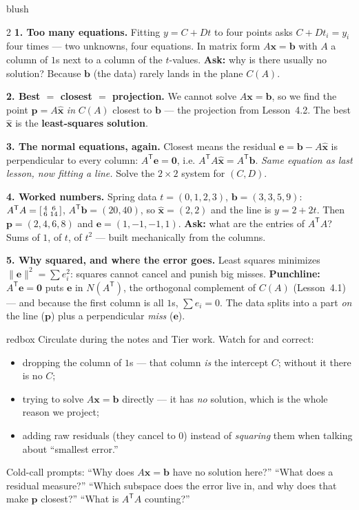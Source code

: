 \documentclass[10pt]{article}
\newcommand{\xx}{\mathbf{x}}
\newcommand{\bb}{\mathbf{b}}
\newcommand{\pp}{\mathbf{p}}
\newcommand{\ee}{\mathbf{e}}
\newcommand{\zero}{\mathbf{0}}
\newcommand{\T}{\mathsf{T}}
\begin{document}
\begin{skillbox}[Lesson]{blush}
\begin{multicols}{2}
\textbf{1. Too many equations.} Fitting $y=C+Dt$ to four points asks $C+Dt_i=y_i$ four times --- two
unknowns, four equations. In matrix form $A\xx=\bb$ with $A$ a column of $1$s next to a column of the
$t$-values. \textbf{Ask:} why is there usually no solution? Because $\bb$ (the data) rarely lands in the
plane $C(A)$.

\textbf{2. Best $=$ closest $=$ projection.} We cannot solve $A\xx=\bb$, so we find the point $\pp=A\hat{\xx}$
\emph{in} $C(A)$ closest to $\bb$ --- the projection from Lesson~4.2. The best $\hat{\xx}$ is the
\textbf{least-squares solution}.

\textbf{3. The normal equations, again.} Closest means the residual $\ee=\bb-A\hat{\xx}$ is perpendicular
to every column: $A^{\T}\ee=\zero$, i.e. $A^{\T}A\hat{\xx}=A^{\T}\bb$. \emph{Same equation as last lesson,
now fitting a line.} Solve the $2\times2$ system for $(C,D)$.

\columnbreak

\textbf{4. Worked numbers.} Spring data $t=(0,1,2,3)$, $\bb=(3,3,5,9)$: $A^{\T}A=\begin{bsmallmatrix} 4&6\\6&14 \end{bsmallmatrix}$,
$A^{\T}\bb=(20,40)$, so $\hat{\xx}=(2,2)$ and the line is $y=2+2t$. Then $\pp=(2,4,6,8)$ and
$\ee=(1,-1,-1,1)$. \textbf{Ask:} what are the entries of $A^{\T}A$? Sums of $1$, of $t$, of $t^2$ --- built
mechanically from the columns.

\textbf{5. Why squared, and where the error goes.} Least squares minimizes $\|\ee\|^2=\sum e_i^2$: squares
cannot cancel and punish big misses. \textbf{Punchline:} $A^{\T}\ee=\zero$ puts $\ee$ in $N(A^{\T})$, the
orthogonal complement of $C(A)$ (Lesson~4.1) --- and because the first column is all $1$s, $\sum e_i=0$.
The data splits into a part \emph{on} the line ($\pp$) plus a perpendicular \emph{miss} ($\ee$).
\end{multicols}
\end{skillbox}

\begin{skillbox}{redbox}
Circulate during the notes and Tier work. Watch for and correct:
\begin{itemize}[leftmargin=1.2em, nosep]
  \item dropping the column of $1$s --- that column \emph{is} the intercept $C$; without it there is no $C$;
  \item trying to solve $A\xx=\bb$ directly --- it has \emph{no} solution, which is the whole reason we project;
  \item adding raw residuals (they cancel to $0$) instead of \emph{squaring} them when talking about ``smallest error.''
\end{itemize}
Cold-call prompts: ``Why does $A\xx=\bb$ have no solution here?'' ``What does a residual measure?'' ``Which
subspace does the error live in, and why does that make $\pp$ closest?'' ``What is $A^{\T}A$ counting?''
\end{skillbox}
\end{document}
